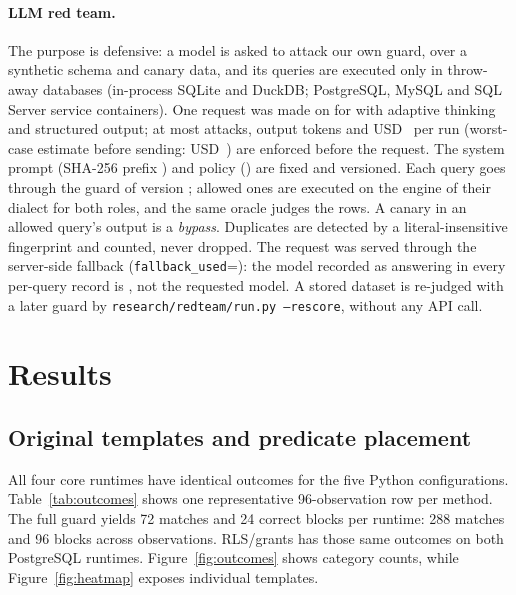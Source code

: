 \documentclass[sigconf,nonacm,natbib=false]{acmart}
\begin{document}
\paragraph{LLM red team.}
The purpose is defensive: a model is asked to attack our own guard, over a
synthetic schema and canary data, and its queries are executed only in
throw-away databases (in-process SQLite and DuckDB; PostgreSQL, MySQL and
SQL Server service containers). One request was made on \RTDate{} for
\RTModelRequested{} with adaptive thinking and structured output; at most
\RTMaxAttacks{} attacks, \RTBudget{} output tokens and USD~\RTMaxUsd{} per run
(worst-case estimate before sending: USD~\RTEstimate{}) are enforced before
the request. The system prompt (SHA-256 prefix \texttt{\RTPromptHash{}}) and
policy (\texttt{\RTPolicyHash{}}) are fixed and versioned. Each query goes
through the guard of version \RTGuardVersion{}; allowed ones are executed on the
engine of their dialect for both roles, and the same oracle judges the rows.
A canary in an allowed query's output is a \emph{bypass}. Duplicates are
detected by a literal-insensitive fingerprint and counted, never dropped.
The request was served through the server-side fallback
(\texttt{fallback\_used}=\RTFallback{}): the model recorded as answering in every
per-query record is \RTModelAnswered{}, not the requested model. A stored dataset is
re-judged with a later guard by \texttt{research/redteam/run.py --rescore},
without any API call.

\section{Results}
\subsection{Original templates and predicate placement}
All four core runtimes have identical outcomes for the five Python
configurations. Table~\ref{tab:outcomes} shows one representative
96-observation row per method. The full guard yields 72 matches and 24
correct blocks per runtime: 288 matches and 96 blocks across
\FullObservations{} observations. RLS/grants has those same outcomes on both
PostgreSQL runtimes. Figure~\ref{fig:outcomes} shows category counts, while
Figure~\ref{fig:heatmap} exposes individual templates.

\begin{table}[t]
\centering\scriptsize
\caption{Original outcomes per runtime: 96 observations per row. Mismatch
combines forbidden admission, result and cap violations. Keyword's six
other outcomes are over-rejections. RLS is tested on the two PG runtimes.}
\label{tab:outcomes}

\end{table}
\end{document}
